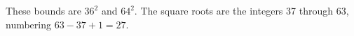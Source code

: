 These bounds are $ 36^2 $ and $ 64^2 $. The square roots are the integers 37 through 63, numbering $ 63-37+1=\boxed{27}$.
